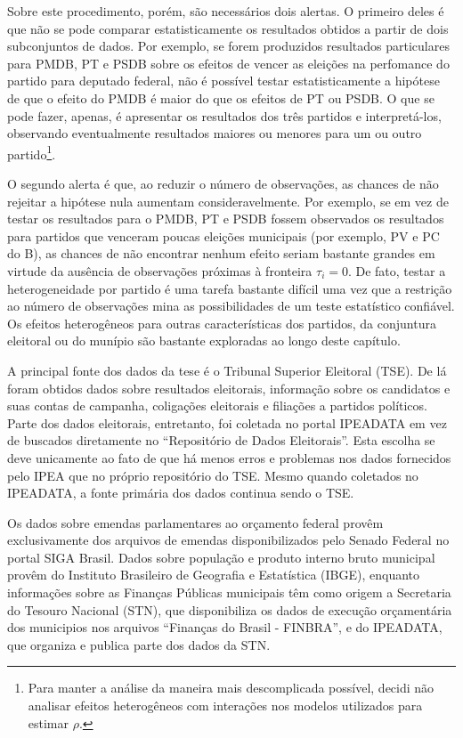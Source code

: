 Sobre este procedimento, porém, são necessários dois alertas. O primeiro deles é que não se pode comparar estatisticamente os resultados obtidos a partir de dois subconjuntos de dados. Por exemplo, se forem produzidos resultados particulares para PMDB, PT e PSDB sobre os efeitos de vencer as eleições na perfomance do partido para deputado federal, não é possível testar estatisticamente a hipótese de que o efeito do PMDB é maior do que os efeitos de PT ou PSDB. O que se pode fazer, apenas, é apresentar os resultados dos três partidos e interpretá-los, observando eventualmente resultados maiores ou menores para um ou outro partido\footnote{Para manter a análise da maneira mais descomplicada possível, decidi não analisar efeitos heterogêneos com interações nos modelos utilizados para estimar $\rho$.}.

O segundo alerta é que, ao reduzir o número de observações, as chances de não rejeitar a hipótese nula aumentam consideravelmente. Por exemplo, se em vez de testar os resultados para o PMDB, PT e PSDB fossem observados os resultados para partidos que venceram poucas eleições municipais (por exemplo, PV e PC do B), as chances de não encontrar nenhum efeito seriam bastante grandes em virtude da ausência de observações próximas à fronteira $\tau_{i}=0$. De fato, testar a heterogeneidade por partido é uma tarefa bastante difícil uma vez que a restrição ao número de observações mina as possibilidades de um teste estatístico confiável. Os efeitos heterogêneos para outras características dos partidos, da conjuntura eleitoral ou do munípio são bastante exploradas ao longo deste capítulo.

A principal fonte dos dados da tese é o Tribunal Superior Eleitoral (TSE). De lá foram obtidos dados sobre resultados eleitorais, informação sobre os candidatos e suas contas de campanha, coligações eleitorais e filiações a partidos políticos. Parte dos dados eleitorais, entretanto, foi coletada no portal IPEADATA em vez de buscados diretamente no ``Repositório de Dados Eleitorais''. Esta escolha se deve unicamente ao fato de que há menos erros e problemas nos dados fornecidos pelo IPEA que no próprio repositório do TSE. Mesmo quando coletados no IPEADATA, a fonte primária dos dados continua sendo o TSE.

Os dados sobre emendas parlamentares ao orçamento federal provêm exclusivamente dos arquivos de emendas disponibilizados pelo Senado Federal no portal SIGA Brasil. Dados sobre população e produto interno bruto municipal provêm do Instituto Brasileiro de Geografia e Estatística (IBGE), enquanto informações sobre as Finanças Públicas municipais têm como origem a Secretaria do Tesouro Nacional (STN), que disponibiliza os dados de execução orçamentária dos municipios nos arquivos ``Finanças do Brasil - FINBRA'', e do IPEADATA, que organiza e publica parte dos dados da STN.

